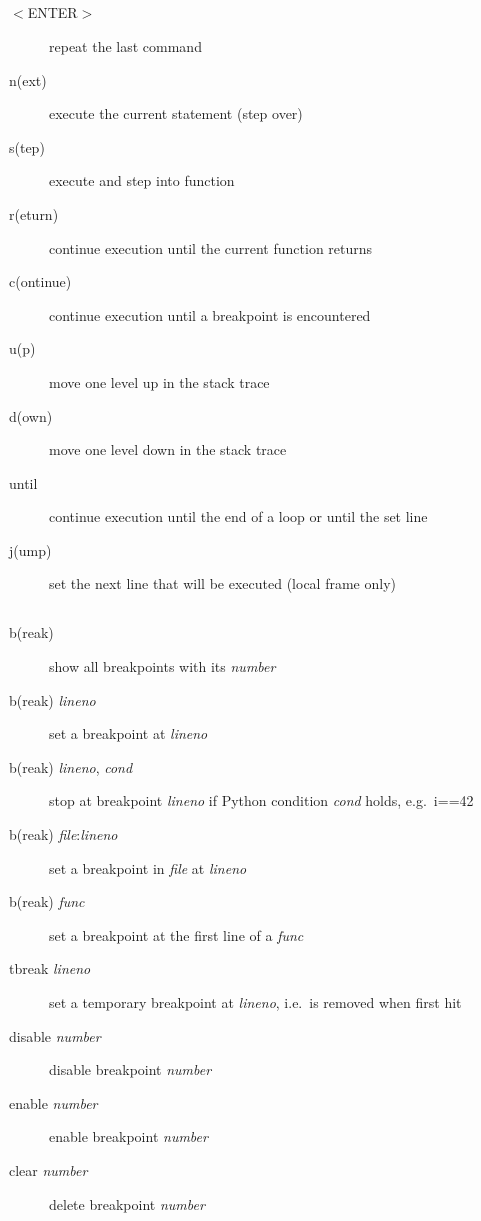 \documentclass[10pt,landscape,a4paper]{article}
\newcommand{\keystroke}[1]{$<$#1$>$}
\newcommand{\blacksubsection}[1]{\subsection{\colorbox{black}{\makebox[\linewidth][c]{\textcolor{white}{#1}}}}}
\begin{document}
\begin{multicols}{3}
    \blacksubsection{Movement}
      \begin{description}
        \item[\keystroke{ENTER}] repeat the last command
        \item[n(ext)] execute the current statement (step over)
        \item[s(tep)] execute and step into function
        \item[r(eturn)] continue execution until the current function returns
        \item[c(ontinue)] continue execution until a breakpoint is encountered
        \item[u(p)] move one level up in the stack trace
        \item[d(own)] move one level down in the stack trace
        \item[until] continue execution until the end of a loop or until the set line
        \item[j(ump)] set the next line that will be executed (local frame only)
      \end{description}

    \blacksubsection{Breakpoints}
      \begin{description}
        \item[b(reak)] show all breakpoints with its \textit{number}
        \item[b(reak) \textit{lineno}] set a breakpoint at \textit{lineno}
        \item[b(reak) \textit{lineno}, \textit{cond}] stop at breakpoint \textit{lineno} if Python condition \textit{cond} holds, e.g.\ i==42
        \item[b(reak) \textit{file}:\textit{lineno}] set a breakpoint in \textit{file} at \textit{lineno}
        \item[b(reak) \textit{func}] set a breakpoint at the first line of a \textit{func}
        \item[tbreak \textit{lineno}] set a temporary breakpoint at \textit{lineno}, i.e.\ is removed when first hit
        \item[disable \textit{number}] disable breakpoint \textit{number}
        \item[enable \textit{number}] enable breakpoint \textit{number}
        \item[clear \textit{number}] delete breakpoint \textit{number}
      \end{description}

  \end{multicols}
\end{document}
